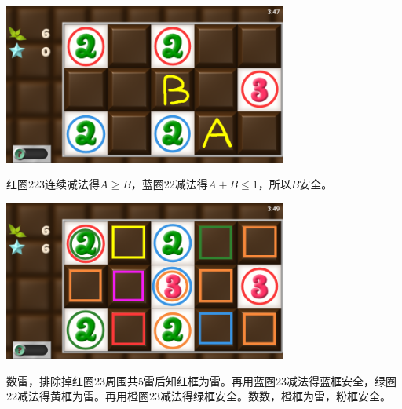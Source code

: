 \subsection{} %
\begin{center}
    \includegraphics[width=0.7\textwidth]{puzzle/91-1.png}
\end{center}
红圈223连续减法得$A\ge B$，蓝圈22减法得$A+B\le 1$，所以$B$安全。
\begin{center}
    \includegraphics[width=0.7\textwidth]{puzzle/91-2.png}
\end{center}
数雷，排除掉红圈23周围共5雷后知红框为雷。再用蓝圈23减法得蓝框安全，绿圈22减法得黄框为雷。再用橙圈23减法得绿框安全。数数，橙框为雷，粉框安全。

